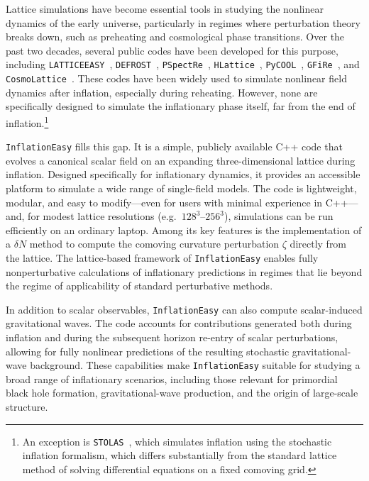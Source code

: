 \documentclass[aps, nofootinbib,superscriptaddress, preprintnumbers, longbibliography]{article}
\begin{document}
Lattice simulations have become essential tools in studying the nonlinear dynamics of the early universe, particularly in regimes where perturbation theory breaks down, such as preheating and cosmological phase transitions. Over the past two decades, several public codes have been developed for this purpose, including \texttt{LATTICEEASY}~\cite{latticeeasy}, \texttt{DEFROST}~\cite{Frolov_2008}, \texttt{PSpectRe}~\cite{Easther_2010}, \texttt{HLattice}~\cite{hlattice}, \texttt{PyCOOL}~\cite{Sainio_2012}, \texttt{GFiRe}~\cite{Lozanov_2020}, and \texttt{CosmoLattice}~\cite{figueroa2021cosmolattice}. These codes have been widely used to simulate nonlinear field dynamics after inflation, especially during reheating. However, none are specifically designed to simulate the inflationary phase itself, far from the end of inflation.\footnote{An exception is \texttt{STOLAS}~\cite{Mizuguchi:2024kbl}, which simulates inflation using the stochastic inflation formalism, which differs substantially from the standard lattice method of solving differential equations on a fixed comoving grid.}

\texttt{InflationEasy} fills this gap. It is a simple, publicly available C++ code that evolves a canonical scalar field on an expanding three-dimensional lattice during inflation. Designed specifically for inflationary dynamics, it provides an accessible platform to simulate a wide range of single-field models. The code is lightweight, modular, and easy to modify—even for users with minimal experience in C++—and, for modest lattice resolutions (e.g.\ $128^3$--$256^3$), simulations can be run efficiently on an ordinary laptop. Among its key features is the implementation of a $\delta N$ method to compute the comoving curvature perturbation $\zeta$ directly from the lattice. The lattice-based framework of \texttt{InflationEasy} enables fully nonperturbative calculations of inflationary predictions in regimes that lie beyond the regime of applicability of standard perturbative methods.


In addition to scalar observables, \texttt{InflationEasy} can also compute scalar-induced gravitational waves. The code accounts for contributions generated both during inflation and during the subsequent horizon re-entry of scalar perturbations, allowing for fully nonlinear predictions of the resulting stochastic gravitational-wave background. These capabilities make \texttt{InflationEasy} suitable for studying a broad range of inflationary scenarios, including those relevant for primordial black hole formation, gravitational-wave production, and the origin of large-scale structure.
\end{document}

